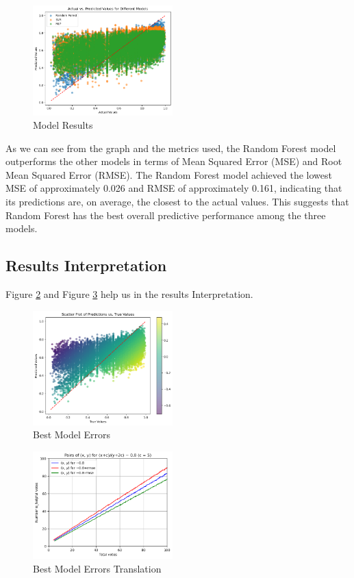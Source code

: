 \begin{figure}[H]
    \centering
    \includegraphics[width=0.48\textwidth]{./figures/model_results.png}
    \caption{Model Results}
    \label{fig:model_results}
\end{figure}

\noindent
As we can see from the graph and the metrics used, the Random Forest model outperforms the other models in terms of Mean Squared Error 
(MSE) and Root Mean Squared Error (RMSE). The Random Forest model achieved the lowest MSE of approximately 0.026 and RMSE of approximately 
0.161, indicating that its predictions are, on average, the closest to the actual values. 
This suggests that Random Forest has the best overall predictive performance among the three models.

\subsection{Results Interpretation}
Figure \ref{fig:model_best_scatter} and Figure \ref{fig:model_best_lines} help us in the results Interpretation.


\begin{figure}[H]
    \centering
    \includegraphics[width=0.48\textwidth]{./figures/model_best_scatter.png}
    \caption{Best Model Errors}
    \label{fig:model_best_scatter}
\end{figure}

\begin{figure}[H]
    \centering
    \includegraphics[width=0.48\textwidth]{./figures/model_best_lines.png}
    \caption{Best Model Errors Translation}
    \label{fig:model_best_lines}
\end{figure}




